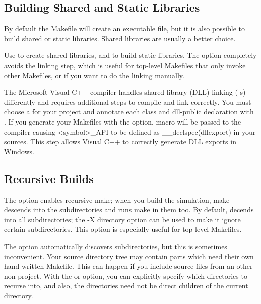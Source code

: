 \subsection{Building Shared and Static Libraries}
\label{sec:build-sim-progs:building-shared-and-static-libraries}

By default the Makefile will create an executable file, but it is also
possible to build shared or static libraries. Shared libraries
are usually a better choice.

Use  to create shared libraries, and 
to build static libraries. The  option completely avoids
the linking step, which is useful for top-level Makefiles that only invoke
other Makefiles, or if you want to do the linking manually.

\ifcommercial
\begin{note}
The Microsoft Visual C++ compiler handles shared library (DLL) linking (-s)
differently and requires additional steps to compile and link correctly.
You must choose a  for your project and annotate each class
and dll-public declaration with . If you generate your Makefiles
with the  option,  macro will be passed to
the compiler causing <symbol>\_API to be defined as \_\_declspec(dllexport) in
your sources. This step allows Visual C++ to correctly generate DLL exports in Windows.
\end{note}
\fi


\subsection{Recursive Builds}
\label{sec:build-sim-progs:recursive-builds}


The  option enables recursive make; when you build the simulation, make
descends into the subdirectories and runs make in them too.
By default,  decends into all subdirectories; the -X directory option
can be used to make it ignore certain subdirectories. This option is especially useful
for top level Makefiles.


The  option automatically discovers subdirectories, but this
is sometimes inconvenient. Your source directory tree may contain
parts which need their own hand written Makefile. This can happen if
you include source files from an other non {\opp} project. With the 
or  option, you can explicitly specify which directories to
recurse into, and also, the directories need not be direct children of the
current directory.


